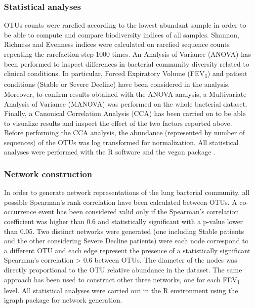 \subsubsection{Statistical analyses}
OTUs counts were rarefied according to the lowest abundant sample in order to be able to compute and compare biodiversity indices of all samples. Shannon, Richness and Evenness indices were calculated on rarefied sequence counts repeating the rarefaction step 1000 times. An Analysis of Variance (ANOVA) has been performed to inspect differences in bacterial community diversity related to clinical conditions. In particular, Forced Expiratory Volume (FEV\textsubscript{1}) and patient conditions (Stable or Severe Decline) have been considered in the analysis. Moreover, to confirm results obtained with the ANOVA analysis, a Multivariate Analysis of Variance (MANOVA) was performed on the whole bacterial dataset. Finally, a Canonical Correlation Analysis (CCA) has been carried on to be able to visualize results and inspect the effect of the two factors reported above. Before performing the CCA analysis, the abundance (represented by number of sequences) of the OTUs was log transformed for normalization. All statistical analyses were performed with the R software \cite{team2012r} and the vegan package \cite{oksanen2007vegan}.\\

\subsubsection{Network construction}
In order to generate network representations of the lung bacterial community, all possible Spearman's rank correlation have been calculated between OTUs. A co-occurrence event has been considered valid only if the Spearman's correlation coefficient was higher than 0.6 and statistically significant with a p-value lower than 0.05. Two distinct networks were generated (one including Stable patients and the other considering Severe Decline patients) were each node correspond to a different OTU and each edge represent the presence of a statistically significant Spearman's correlation {\textgreater} 0.6 between OTUs. The diameter of the nodes was directly proportional to the OTU relative abundance in the dataset. The same approach has been used to construct other three networks, one for each FEV\textsubscript{1} level. All statistical analyses were carried out in the R environment using the igraph package for network generation.\\

